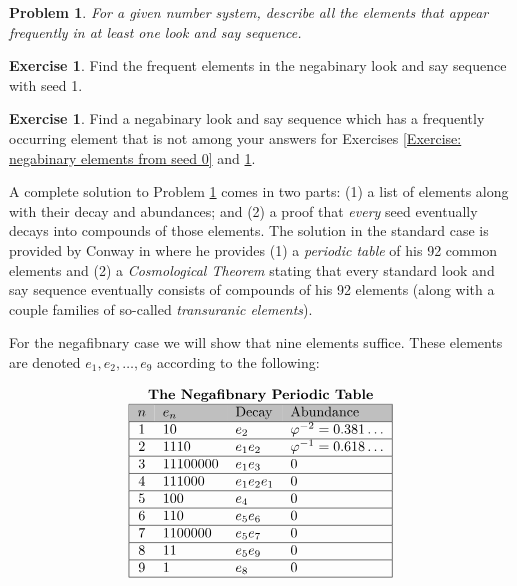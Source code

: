 \documentclass[reqno]{amsart}
\newtheorem{problem}{Problem}
\theoremstyle{definition}
\newtheorem{exercise}[theorem]{Exercise}
\begin{document}
\begin{problem}\label{problem:: cosmological theorem}
    For a given number system, describe all the elements that appear frequently in at least one look and say sequence.
\end{problem} 

\begin{exercise}\label{exercise: negabinary elements from seed 1}
    Find the frequent elements in the negabinary look and say sequence with seed 1. 
\end{exercise}

\begin{exercise}
    Find a negabinary look and say sequence which has a frequently occurring element that is not among your answers for Exercises \ref{Exercise: negabinary elements from seed 0} and \ref{exercise: negabinary elements from seed 1}.
\end{exercise}

A complete solution to Problem \ref{problem:: cosmological theorem} comes in two parts: (1) a list of elements along with their decay and abundances; and (2) a proof that \emph{every} seed eventually decays into compounds of those elements. The solution in the standard case is provided by Conway in \cite{Conway} where he provides (1) a \emph{periodic table} of his 92 common elements and (2) a \emph{Cosmological Theorem} stating that every standard look and say sequence eventually consists of compounds of his 92 elements (along with a couple families of so-called \emph{transuranic elements}). 

For the negafibnary case we will show that nine elements suffice. These elements are denoted $e_1, e_2,\ldots, e_9$ according to the following:

\begin{equation}\label{table:: negafibnary periodic table}
\begin{tabular}{|clll|}
\multicolumn{4}{c}{\textbf{The Negafibnary Periodic Table}} \\ \hline
\rowcolor{lightgray}
$n$ & $e_n$ & \text{Decay} & \text{Abundance} \\ \hline
1 & 10 & $e_2$ & $\varphi^{-2}=0.381\ldots$ \\ \hline
2 & 1110 & $e_1e_2$ & $\varphi^{-1}=0.618\ldots$ \\ \hline
3 & 11100000 & $e_1e_3$ & 0 \\ \hline
4 & 111000 & $e_1e_2e_1$ & 0 \\ \hline
5 & 100 & $e_4$ & 0 \\ \hline
6 & 110 & $e_5e_6$ & 0 \\ \hline
7 & 1100000 & $e_5e_7$ & 0 \\ \hline
8 & 11 & $e_5e_9$ & 0 \\ \hline
9 & 1 & $e_8$ & 0 \\ \hline
\end{tabular}
\end{equation}
\end{document}
